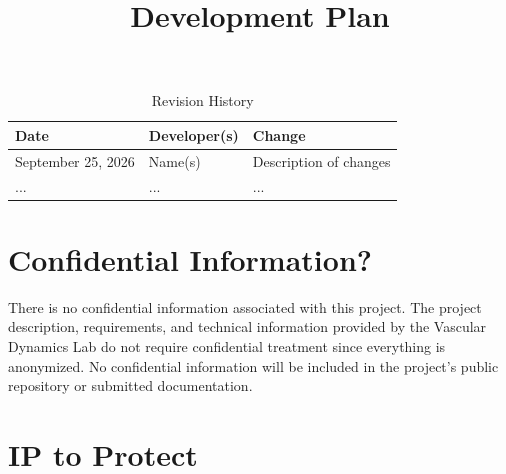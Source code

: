 \documentclass{article}
\title{Development Plan\\\progname}
\author{\authname}
\date{}
\begin{document}
\maketitle

\begin{table}[hp]
\caption{Revision History} \label{TblRevisionHistory}
\begin{tabularx}{\textwidth}{llX}
\toprule
\textbf{Date} & \textbf{Developer(s)} & \textbf{Change}\\
\midrule
September 25, 2026 & Name(s) & Description of changes\\
... & ... & ...\\
\bottomrule
\end{tabularx}
\end{table}

\newpage{}



\section{Confidential Information?}



There is no confidential information associated with this project. The project description, requirements, and technical information provided by the Vascular Dynamics Lab do not require confidential treatment since everything is anonymized. No confidential information will be included in the project's public repository or submitted documentation.

\section{IP to Protect}

\end{document}

